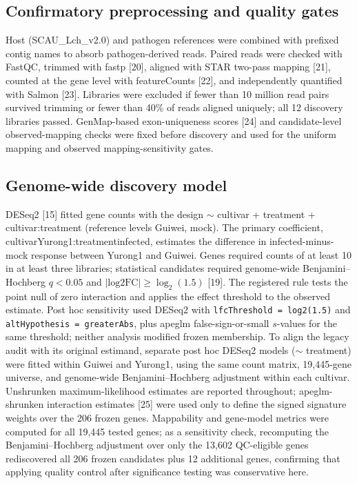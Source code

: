 \documentclass[referee,pdflatex,sn-basic,Numbered]{sn-jnl}
\newcommand{\q}{\textit{q}}
\begin{document}
\subsection{Confirmatory preprocessing and quality gates}

Host (SCAU\_Lch\_v2.0) and pathogen references were combined with prefixed contig names to absorb pathogen-derived reads. Paired reads were checked with FastQC, trimmed with fastp [20], aligned with STAR two-pass mapping [21], counted at the gene level with featureCounts [22], and independently quantified with Salmon [23]. Libraries were excluded if fewer than 10 million read pairs survived trimming or fewer than 40\% of reads aligned uniquely; all 12 discovery libraries passed. GenMap-based exon-uniqueness scores [24] and candidate-level observed-mapping checks were fixed before discovery and used for the uniform mapping and observed mapping-sensitivity gates.

\subsection{Genome-wide discovery model}

DESeq2 [15] fitted gene counts with the design $\sim$ cultivar + treatment + cultivar:treatment (reference levels Guiwei, mock). The primary coefficient, cultivarYurong1:treatmentinfected, estimates the difference in infected-minus-mock response between Yurong1 and Guiwei. Genes required counts of at least 10 in at least three libraries; statistical candidates required genome-wide Benjamini--Hochberg $\q<0.05$ and $|\mathrm{log2FC}|\ge\log_2(1.5)$ [19]. The registered rule tests the point null of zero interaction and applies the effect threshold to the observed estimate. Post hoc sensitivity used DESeq2 with \texttt{lfcThreshold = log2(1.5)} and \texttt{altHypothesis = greaterAbs}, plus apeglm false-sign-or-small $s$-values for the same threshold; neither analysis modified frozen membership. To align the legacy audit with its original estimand, separate post hoc DESeq2 models ($\sim$ treatment) were fitted within Guiwei and Yurong1, using the same count matrix, 19,445-gene universe, and genome-wide Benjamini--Hochberg adjustment within each cultivar. Unshrunken maximum-likelihood estimates are reported throughout; apeglm-shrunken interaction estimates [25] were used only to define the signed signature weights over the 206 frozen genes. Mappability and gene-model metrics were computed for all 19,445 tested genes; as a sensitivity check, recomputing the Benjamini--Hochberg adjustment over only the 13,602 QC-eligible genes rediscovered all 206 frozen candidates plus 12 additional genes, confirming that applying quality control after significance testing was conservative here.
\end{document}
